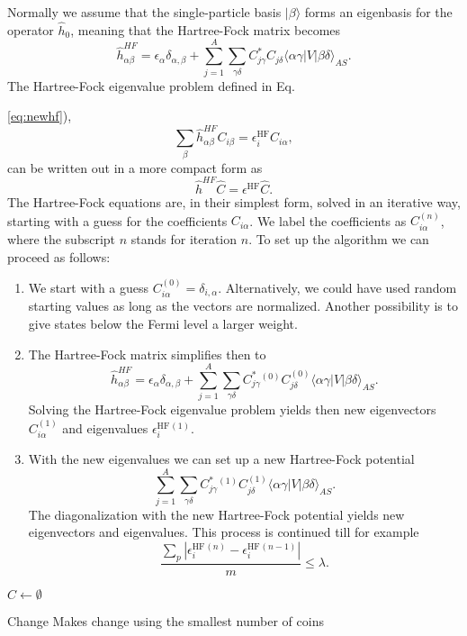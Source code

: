 Normally we assume that the single-particle basis $|\beta\rangle$ forms an eigenbasis for the operator
$\hat{h}_0$, meaning that the Hartree-Fock matrix becomes  
\[
\hat{h}_{\alpha\beta}^{HF}=\epsilon_{\alpha}\delta_{\alpha,\beta}+
\sum_{j=1}^A\sum_{\gamma\delta} C^*_{j\gamma}C_{j\delta}\langle \alpha\gamma|V|\beta\delta\rangle_{AS}.
\]
The Hartree-Fock eigenvalue problem defined in Eq.~{\ref{eq:newhf}),
\[
\sum_{\beta}\hat{h}_{\alpha\beta}^{HF}C_{i\beta}=\epsilon_i^{\mathrm{HF}}C_{i\alpha},
\]
can be written out in a more compact form as
\[
\hat{h}^{HF}\hat{C}=\epsilon^{\mathrm{HF}}\hat{C}. 
\]
The Hartree-Fock equations are, in their simplest form, solved in an iterative way, starting with a guess for the
coefficients $C_{i\alpha}$. We label the coefficients as $C_{i\alpha}^{(n)}$, where the subscript $n$ stands for iteration $n$.
To set up the algorithm we can proceed as follows:
\begin{enumerate}
\item We start with a guess $C_{i\alpha}^{(0)}=\delta_{i,\alpha}$. Alternatively, we could have used random starting values as long as the vectors are normalized. Another possibility is to give states below the Fermi level a larger weight.
\item The Hartree-Fock matrix simplifies then to
\[
\hat{h}_{\alpha\beta}^{HF}=\epsilon_{\alpha}\delta_{\alpha,\beta}+
\sum_{j=1}^A\sum_{\gamma\delta} C^*_{j\gamma}^{(0)}C_{j\delta}^{(0)}\langle \alpha\gamma|V|\beta\delta\rangle_{AS}.
\]
Solving the Hartree-Fock eigenvalue problem yields then new eigenvectors $C_{i\alpha}^{(1)}$ and eigenvalues
$\epsilon_i^{\mathrm{HF}}^{(1)}$. 
\item With the new eigenvalues we can set up a new Hartree-Fock potential 
\[
\sum_{j=1}^A\sum_{\gamma\delta} C^*_{j\gamma}^{(1)}C_{j\delta}^{(1)}\langle \alpha\gamma|V|\beta\delta\rangle_{AS}.
\]
The diagonalization with the new Hartree-Fock potential yields new eigenvectors and eigenvalues.
This process is continued till for example
\[
\frac{\sum_{p} |\epsilon_i^{\mathrm{HF}}^{(n)}-\epsilon_i^{\mathrm{HF}}^{(n-1)}|}{m}\le \lambda.  
\]
\end{enumerate}

\begin{algorithm}
\DontPrintSemicolon %
$C \gets \emptyset$\;
\;
\caption{{\sc Change} Makes change using the smallest number of coins}
\label{algo:change}
\end{algorithm}

}
